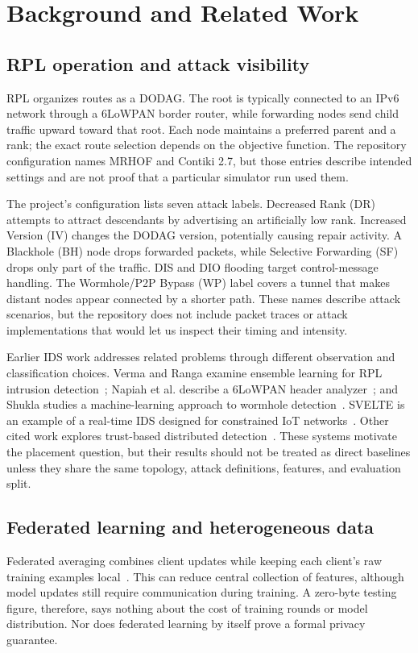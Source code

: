 \documentclass[conference]{IEEEtran}
\begin{document}
\section{Background and Related Work}
\subsection{RPL operation and attack visibility}
RPL organizes routes as a DODAG. The root is typically connected to an IPv6 network through a 6LoWPAN border router, while forwarding nodes send child traffic upward toward that root. Each node maintains a preferred parent and a rank; the exact route selection depends on the objective function. The repository configuration names MRHOF and Contiki 2.7, but those entries describe intended settings and are not proof that a particular simulator run used them.

The project's configuration lists seven attack labels. Decreased Rank (DR) attempts to attract descendants by advertising an artificially low rank. Increased Version (IV) changes the DODAG version, potentially causing repair activity. A Blackhole (BH) node drops forwarded packets, while Selective Forwarding (SF) drops only part of the traffic. DIS and DIO flooding target control-message handling. The Wormhole/P2P Bypass (WP) label covers a tunnel that makes distant nodes appear connected by a shorter path. These names describe attack scenarios, but the repository does not include packet traces or attack implementations that would let us inspect their timing and intensity.

Earlier IDS work addresses related problems through different observation and classification choices. Verma and Ranga examine ensemble learning for RPL intrusion detection~\cite{verma2019elnids}; Napiah et al. describe a 6LoWPAN header analyzer~\cite{napiah2018compression}; and Shukla studies a machine-learning approach to wormhole detection~\cite{shukla2017mlids}. SVELTE is an example of a real-time IDS designed for constrained IoT networks~\cite{raza2013svelte}. Other cited work explores trust-based distributed detection~\cite{khan2017trust,medjek2017trust}. These systems motivate the placement question, but their results should not be treated as direct baselines unless they share the same topology, attack definitions, features, and evaluation split.

\subsection{Federated learning and heterogeneous data}
Federated averaging combines client updates while keeping each client's raw training examples local~\cite{mcmahan2017communication}. This can reduce central collection of features, although model updates still require communication during training. A zero-byte testing figure, therefore, says nothing about the cost of training rounds or model distribution. Nor does federated learning by itself prove a formal privacy guarantee.
\end{document}
